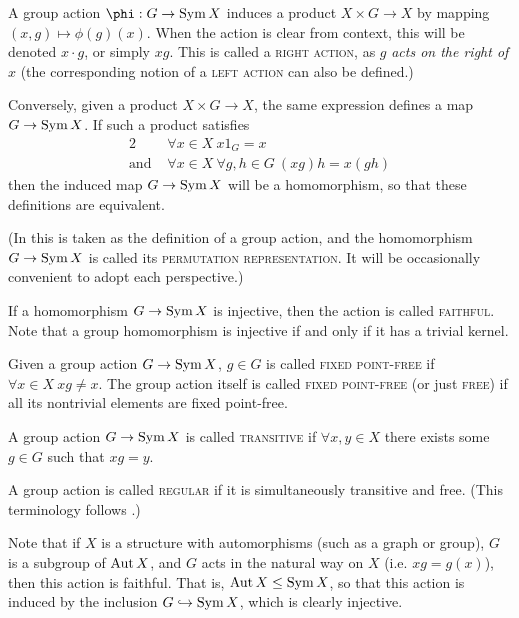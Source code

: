 \documentclass{report}
\begin{document}
    A group action $\phi: G \to \Sym X$ induces a product
    $X \times G \to X$ by mapping $(x, g) \mapsto \phi(g)(x)$.
    When the action is clear from context,
    this will be denoted $x \cdot g$, or simply $xg$.
    This is called a \textsc{right action},
    as $g$ \textit{acts on the right of} $x$
    (the corresponding notion of a \textsc{left action}
    can also be defined.)

    Conversely, given a product $X \times G \to X$,
    the same expression defines a map $G \to \operatorname{Sym} X$.
    If such a product satisfies
    \begin{alignat*}{2}
      &\forall x \in X\ x 1_G = x \\
      \text{and } &\forall x \in X\ \forall g, h \in G\
        (x g) h = x(gh)
    \end{alignat*}
    then the induced map $G \to \operatorname{Sym} X$ will be a homomorphism,
    so that these definitions are equivalent.

    (In \cite{dummit-foote}
    this is taken as the definition of a group action,
    and the homomorphism $G \to \operatorname{Sym} X$ is called its \textsc{permutation
    representation}.  It will be occasionally convenient to adopt each
    perspective.)

    \begin{defn}\label{defn:group-action-types}
      If a homomorphism $G \to \operatorname{Sym} X$ is injective,
      then the action is called \textsc{faithful}.
      Note that a group homomorphism is injective
      if and only if it has a trivial kernel.

      Given a group action $G \to \operatorname{Sym} X$,
      $g \in G$ is called \textsc{fixed point-free}
      if $\forall x \in X\ xg \neq x$.
      The group action itself is called \textsc{fixed point-free}
      (or just \textsc{free}) if all its nontrivial elements
      are fixed point-free.

      A group action $G \to \operatorname{Sym} X$ is called \textsc{transitive}
      if $\forall x, y \in X$ there exists some $g \in G$
      such that $xg = y$.

      A group action is called \textsc{regular} if it is simultaneously
      transitive and free.  (This terminology follows \cite{godsil}.)
    \end{defn}

    Note that if $X$ is a structure with automorphisms
    (such as a graph or group), $G$ is a subgroup of $\operatorname{Aut} X$,
    and $G$ acts in the natural way on $X$ (i.e. $xg = g(x)$),
    then this action is faithful.
    That is, $\operatorname{Aut} X \leq \operatorname{Sym} X$,
    so that this action is induced by the inclusion $G \hookrightarrow \operatorname{Sym} X$,
    which is clearly injective.
\end{document}
